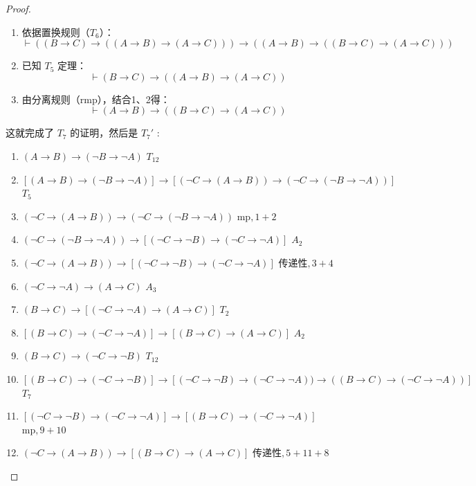 \documentclass[oneside]{book}
\theoremstyle{definition}
\begin{document}
\begin{proof}
\begin{enumerate}
	\item 依据置换规则（$T_6$）：
	\[
	\vdash \left( (B \to C) \to \left( (A \to B) \to (A \to C) \right) \right) \to \left( (A \to B) \to \left( (B \to C) \to (A \to C) \right) \right)
	\]
	\item 已知 $T_5$ 定理：
	\[
	\vdash (B \to C) \to \left( (A \to B) \to (A \to C) \right)
	\]
	\item 由分离规则（rmp），结合1、2得：
	\[
	\vdash (A \to B) \to \left( (B \to C) \to (A \to C) \right)
	\]
	
\end{enumerate}
这就完成了 \(T_7\) 的证明，然后是 \(T_7'\) :
\begin{enumerate}
	\item \( (A \to B) \to (\neg B \to \neg A) \) \quad \( T_{12} \)
	\item \( [(A \to B) \to (\neg B \to \neg A)] \to [(\neg C \to (A \to B)) \to (\neg C \to (\neg B \to \neg A))] \) \quad \( T_5 \)
	\item \( (\neg C \to (A \to B)) \to (\neg C \to (\neg B \to \neg A)) \) \quad \( \text{mp}, 1+2 \)
	\item \( (\neg C \to (\neg B \to \neg A)) \to [(\neg C \to \neg B) \to (\neg C \to \neg A)] \) \quad \( A_2 \)
	\item \( (\neg C \to (A \to B)) \to [(\neg C \to \neg B) \to (\neg C \to \neg A)] \) \quad \( \text{传递性}, 3+4 \)
	\item \( (\neg C \to \neg A) \to (A \to C) \) \quad \( A_3 \)
	\item \( (B \to C) \to [(\neg C \to \neg A) \to (A \to C)] \) \quad \( T_2 \)
	\item \( [(B \to C) \to (\neg C \to \neg A)] \to [(B \to C) \to (A \to C)] \) \quad \( A_2 \)
	\item \( (B \to C) \to (\neg C \to \neg B) \) \quad \( T_{12} \)
	\item \( [(B \to C) \to (\neg C \to \neg B)] \to [(\neg C \to \neg B) \to (\neg C \to \neg A)) \to ((B \to C) \to (\neg C \to \neg A))] \) \quad \( T_7 \)
	\item \( [(\neg C \to \neg B) \to (\neg C \to \neg A)] \to [(B \to C) \to (\neg C \to \neg A)] \) \quad \( \text{mp}, 9+10 \)
	\item \( (\neg C \to (A \to B)) \to [(B \to C) \to (A \to C)] \) \quad \( \text{传递性}, 5+11+8 \)
\end{enumerate}



\end{proof}
\end{document}
